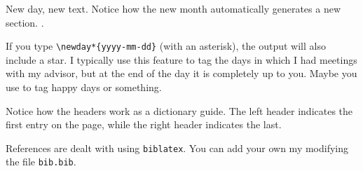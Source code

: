 \documentclass[a4paper, 11pt, oneside]{researchjournal} %
\begin{document}
 New day, new text. Notice how the new month automatically generates a new section. 
\daybib\cite{wald1984GeneralRelativity}.

 If you type \verb|\newday*{yyyy-mm-dd}| (with an asterisk), the output will also include a star. I typically use this feature to tag the days in which I had meetings with my advisor, but at the end of the day it is completely up to you. Maybe you use to tag happy days or something. 

 Notice how the headers work as a dictionary guide. The left header indicates the first entry on the page, while the right header indicates the last. 

 References are dealt with using \verb|biblatex|. You can add your own my modifying the file \verb|bib.bib|.
\end{document}
